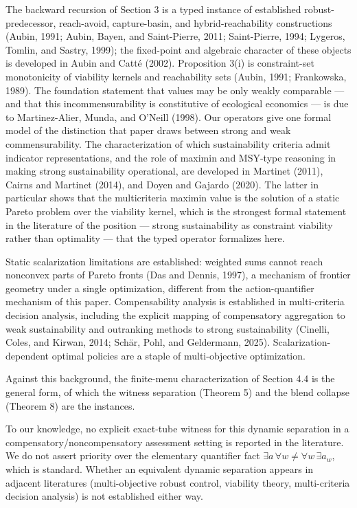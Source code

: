 \documentclass[review,11pt]{elsarticle}
\begin{document}
The backward recursion of Section 3 is
a typed instance of established robust-predecessor, reach-avoid,
capture-basin, and hybrid-reachability constructions (Aubin, 1991;
Aubin, Bayen, and Saint-Pierre, 2011; Saint-Pierre, 1994; Lygeros,
Tomlin, and Sastry, 1999); the fixed-point and algebraic character of these objects is developed in Aubin and Catt\'e (2002). Proposition 3(i) is constraint-set
monotonicity of viability kernels and reachability sets (Aubin, 1991;
Frankowska, 1989). The foundation statement that values may be only
weakly comparable --- and that this incommensurability is constitutive
of ecological economics --- is due to Martinez-Alier, Munda, and O'Neill
(1998). Our operators give one formal model of the distinction that
paper draws between strong and weak commensurability. The
characterization of which sustainability criteria admit indicator
representations, and the role of maximin and MSY-type reasoning in
making strong sustainability operational, are developed in Martinet
(2011), Cairns and Martinet (2014), and Doyen and Gajardo (2020). The
latter in particular shows that the multicriteria maximin value is the
solution of a static Pareto problem over the viability kernel, which is
the strongest formal statement in the literature of the position ---
strong sustainability as constraint viability rather than optimality ---
that the typed operator formalizes here.

Static scalarization
limitations are established: weighted sums cannot reach nonconvex parts
of Pareto fronts (Das and Dennis, 1997), a mechanism of frontier
geometry under a single optimization, different from the
action-quantifier mechanism of this paper. Compensability analysis is
established in multi-criteria decision analysis, including the explicit
mapping of compensatory aggregation to weak sustainability and
outranking methods to strong sustainability (Cinelli, Coles, and Kirwan,
2014; Sch\"ar, Pohl, and Geldermann, 2025). Scalarization-dependent
optimal policies are a staple of multi-objective optimization.

Against this background, the finite-menu characterization of
Section 4.4 is the general form, of which the witness separation
(Theorem 5) and the blend collapse (Theorem 8) are the instances.

To our knowledge, no explicit exact-tube witness for this dynamic
separation in a compensatory/noncompensatory assessment setting is
reported in the literature. We do not assert priority over the
elementary quantifier fact
\(\exists a\, \forall w \neq \forall w\, \exists a_w\), which is
standard. Whether an equivalent dynamic separation appears in adjacent
literatures (multi-objective robust control, viability theory,
multi-criteria decision analysis) is not established either way.
\end{document}
